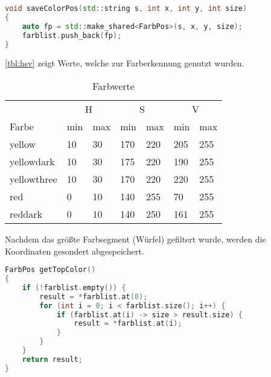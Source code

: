 \begin{lstlisting}[language=c++,
                   caption={Abspeichern der Farbwerte},
                   label={lst:savecolorpos}]
void saveColorPos(std::string s, int x, int y, int size)
{
    auto fp = std::make_shared<FarbPos>(s, x, y, size);
    farblist.push_back(fp);
}
\end{lstlisting}

        \autoref{tbl:hsv} zeigt Werte, welche zur Farberkennung genutzt wurden.

        \begin{table}[h]
            \caption{Farbwerte}
            \label{tbl:hsv}
            \begin{center}
                \begin{tabular}[]{| l | l | l | l | l | l | l |}
                    &
                    \multicolumn{2}{|c|}{H} &
                    \multicolumn{2}{|c|}{S} &
                    \multicolumn{2}{|c|}{V} \\

                    Farbe
                    & min & max
                    & min & max
                    & min & max \\

                    \hline
                    yellow      & 10 & 30 & 170 & 220 & 205 & 255 \\
                    yellowdark  & 10 & 30 & 175 & 220 & 190 & 255 \\
                    yellowthree & 10 & 30 & 170 & 220 & 220 & 255 \\
                    red         & 0  & 10 & 140 & 255 & 70  & 255 \\
                    reddark     & 0  & 10 & 140 & 250 & 161 & 255 \\

                \end{tabular}
            \end{center}
        \end{table}

        Nachdem das größte Farbsegment (Würfel) gefiltert wurde, werden die
        Koordinaten gesondert abgespeichert.

\begin{lstlisting}[language=c++,
                   caption={Finden der größten Farbfläche},
                   label={lst:biggestcolorsurface}]
FarbPos getTopColor()
{
    if (!farblist.empty()) {
        result = *farblist.at(0);
        for (int i = 0; i < farblist.size(); i++) {
            if (farblist.at(i) -> size > result.size) {
                result = *farblist.at(i);
            }
        }
    }
    return result;
}
\end{lstlisting}

